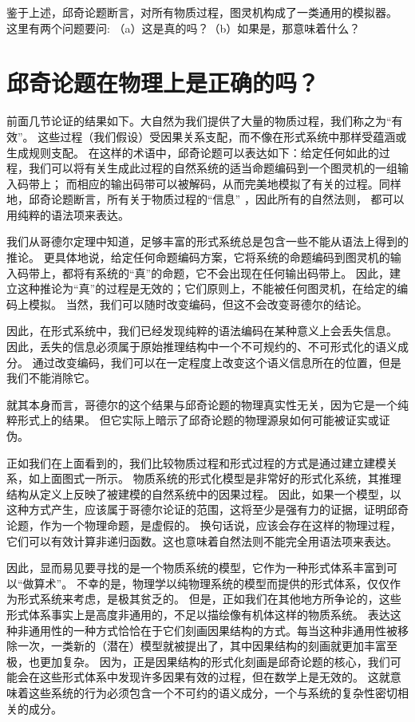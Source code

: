 \documentclass[a4paper,12pt]{article}
\begin{document}
鉴于上述，邱奇论题断言，对所有物质过程，图灵机构成了一类通用的模拟器。 这里有两个问题要问: （a）这是真的吗？（b）如果是，那意味着什么？

\section{邱奇论题在物理上是正确的吗？}

前面几节论证的结果如下。大自然为我们提供了大量的物质过程，我们称之为“有效”。
这些过程（我们假设）受因果关系支配，而不像在形式系统中那样受蕴涵或生成规则支配。
在这样的术语中，邱奇论题可以表达如下：给定任何如此的过程，我们可以将有关生成此过程的自然系统的适当命题编码到一个图灵机的一组输入码带上；
而相应的输出码带可以被解码，从而完美地模拟了有关的过程。同样地，邱奇论题断言，所有关于物质过程的“信息” ，因此所有的自然法则，
都可以用纯粹的语法项来表达。

我们从哥德尔定理中知道，足够丰富的形式系统总是包含一些不能从语法上得到的推论。
更具体地说，给定任何命题编码方案，它将系统的命题编码到图灵机的输入码带上，都将有系统的“真”的命题，它不会出现在任何输出码带上。
因此，建立这种推论为“真”的过程是无效的；它们原则上，不能被任何图灵机，在给定的编码上模拟。
当然，我们可以随时改变编码，但这不会改变哥德尔的结论。

因此，在形式系统中，我们已经发现纯粹的语法编码在某种意义上会丢失信息。
因此，丢失的信息必须属于原始推理结构中一个不可规约的、不可形式化的语义成分。
通过改变编码，我们可以在一定程度上改变这个语义信息所在的位置，但是我们不能消除它。

就其本身而言，哥德尔的这个结果与邱奇论题的物理真实性无关，因为它是一个纯粹形式上的结果。
但它实际上暗示了邱奇论题的物理源泉如何可能被证实或证伪。

正如我们在上面看到的，我们比较物质过程和形式过程的方式是通过建立建模关系，如上面图式一所示。
物质系统的形式化模型是非常好的形式化系统，其推理结构从定义上反映了被建模的自然系统中的因果过程。
因此，如果一个模型，以这种方式产生，应该属于哥德尔论证的范围，这将至少是强有力的证据，证明邱奇论题，作为一个物理命题，是虚假的。
换句话说，应该会存在这样的物理过程，它们可以有效计算非递归函数。这也意味着自然法则不能完全用语法项来表达。

因此，显而易见要寻找的是一个物质系统的模型，它作为一种形式体系丰富到可以“做算术”。
不幸的是，物理学以纯物理系统的模型而提供的形式体系，仅仅作为形式系统来考虑，是极其贫乏的。
但是，正如我们在其他地方所争论的，这些形式体系事实上是高度非通用的，不足以描绘像有机体这样的物质系统\cite{RosenRinpress}。
表达这种非通用性的一种方式恰恰在于它们刻画因果结构的方式。每当这种非通用性被移除一次，一类新的（潜在）模型就被提出了，其中因果结构的刻画就更加丰富至极，也更加复杂。
因为，正是因果结构的形式化刻画是邱奇论题的核心，我们可能会在这些形式体系中发现许多因果有效的过程，但在数学上是无效的。
这就意味着这些系统的行为必须包含一个不可约的语义成分，一个与系统的复杂性密切相关的成分。
\end{document}
